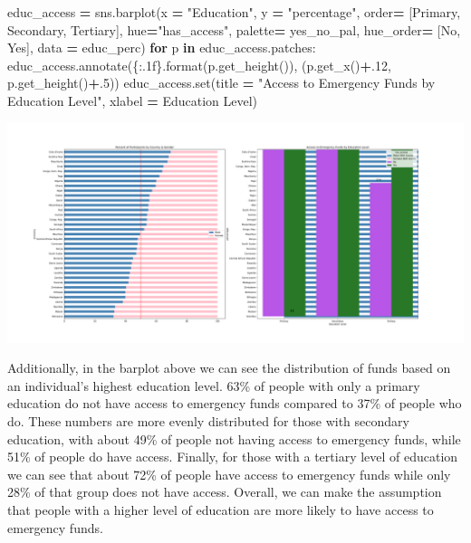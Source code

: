 \documentclass[water,article,submit,moreauthors,pdftex]{mdpi}
\newenvironment{Shaded}{\begin{snugshade}}{\end{snugshade}}
\newcommand{\BuiltInTok}[1]{#1}
\newcommand{\ControlFlowTok}[1]{\textcolor[rgb]{0.13,0.29,0.53}{\textbf{#1}}}
\newcommand{\FloatTok}[1]{\textcolor[rgb]{0.00,0.00,0.81}{#1}}
\newcommand{\KeywordTok}[1]{\textcolor[rgb]{0.13,0.29,0.53}{\textbf{#1}}}
\newcommand{\NormalTok}[1]{#1}
\newcommand{\OperatorTok}[1]{\textcolor[rgb]{0.81,0.36,0.00}{\textbf{#1}}}
\newcommand{\SpecialCharTok}[1]{\textcolor[rgb]{0.00,0.00,0.00}{#1}}
\newcommand{\StringTok}[1]{\textcolor[rgb]{0.31,0.60,0.02}{#1}}
\begin{document}
\begin{Shaded}
\begin{Highlighting}[]
\NormalTok{educ\_access }\OperatorTok{=}\NormalTok{ sns.barplot(x }\OperatorTok{=} \StringTok{"Education"}\NormalTok{, y }\OperatorTok{=} \StringTok{"percentage"}\NormalTok{, order}\OperatorTok{=}\NormalTok{ [}\StringTok{\textquotesingle{}Primary\textquotesingle{}}\NormalTok{, }\StringTok{\textquotesingle{}Secondary\textquotesingle{}}\NormalTok{, }\StringTok{\textquotesingle{}Tertiary\textquotesingle{}}\NormalTok{], hue}\OperatorTok{=}\StringTok{"has\_access"}\NormalTok{, palette}\OperatorTok{=}\NormalTok{ yes\_no\_pal, hue\_order}\OperatorTok{=}\NormalTok{ [}\StringTok{\textquotesingle{}No\textquotesingle{}}\NormalTok{, }\StringTok{\textquotesingle{}Yes\textquotesingle{}}\NormalTok{], data }\OperatorTok{=}\NormalTok{ educ\_perc)}
\ControlFlowTok{for}\NormalTok{ p }\KeywordTok{in}\NormalTok{ educ\_access.patches:}
\NormalTok{   educ\_access.annotate(}\StringTok{\textquotesingle{}}\SpecialCharTok{\{:.1f\}}\StringTok{\textquotesingle{}}\NormalTok{.}\BuiltInTok{format}\NormalTok{(p.get\_height()), (p.get\_x()}\OperatorTok{+}\FloatTok{.12}\NormalTok{, p.get\_height()}\OperatorTok{+}\FloatTok{.5}\NormalTok{))}
\NormalTok{educ\_access.}\BuiltInTok{set}\NormalTok{(title }\OperatorTok{=} \StringTok{"Access to Emergency Funds by Education Level"}\NormalTok{, xlabel }\OperatorTok{=} \StringTok{\textquotesingle{}Education Level\textquotesingle{}}\NormalTok{)}
\end{Highlighting}
\end{Shaded}

\includegraphics{term_paper_files/figure-latex/unnamed-chunk-20-15.pdf}

Additionally, in the barplot above we can see the distribution of funds
based on an individual's highest education level. 63\% of people with
only a primary education do not have access to emergency funds compared
to 37\% of people who do. These numbers are more evenly distributed for
those with secondary education, with about 49\% of people not having
access to emergency funds, while 51\% of people do have access. Finally,
for those with a tertiary level of education we can see that about 72\%
of people have access to emergency funds while only 28\% of that group
does not have access. Overall, we can make the assumption that people
with a higher level of education are more likely to have access to
emergency funds.
\end{document}
